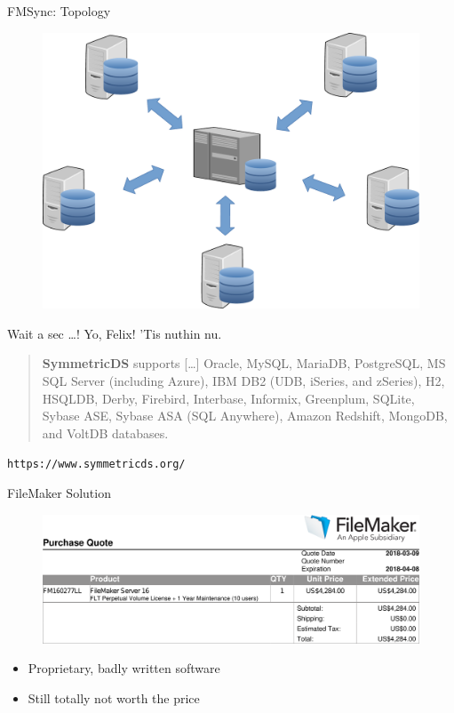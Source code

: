 \documentclass[xcolor=x11names, aspectratio=169,usenames,dvipsnames]{beamer}
\begin{document}
\begin{frame}{FMSync: Topology}
\begin{figure}
	\includegraphics[height=.8\textheight]{img/topo.pdf}
\end{figure}
\end{frame}

\begin{frame}{Wait a sec \dots!}\large
Yo, Felix! 'Tis nuthin nu.\pause\bigskip
\normalsize

\begin{quote}
	\textbf{SymmetricDS} supports [\dots] \alert{Oracle}, \alert{MySQL}, MariaDB, \alert{PostgreSQL}, MS SQL Server (including Azure), IBM DB2 (UDB, iSeries, and zSeries), H2, HSQLDB, Derby, Firebird, Interbase, Informix, Greenplum, \alert{SQLite}, Sybase ASE, Sybase ASA (SQL Anywhere), Amazon Redshift, \alert{MongoDB}, and VoltDB databases.
\end{quote}\vspace{-1em}
\begin{flushright}
	\texttt{https://www.symmetricds.org/}
\end{flushright}
\end{frame}

\begin{frame}{FileMaker Solution}
\begin{figure}
\includegraphics[width=\linewidth]{img/order.png}
\end{figure}\vspace{-2em}
\begin{itemize}
\item Proprietary, badly written software
\item Still totally not worth the price
\end{itemize}
\end{frame}
\end{document}
